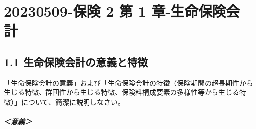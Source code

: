 \documentclass[report,gutter=10mm,fore-edge=10mm,uplatex,dvipdfmx]{jlreq}
\begin{document}
\chapter{20230509-保険 2 第 1
章-生命保険会計}

\section{1.1
生命保険会計の意義と特徴}


「生命保険会計の意義」および「生命保険会計の特徴（保険期間の超長期性から生じる特徴、群団性から生じる特徴、保険料構成要素の多様性等から生じる特徴）」について、簡潔に説明しなさい。


\paragraph{＜意義＞}
\end{document}
